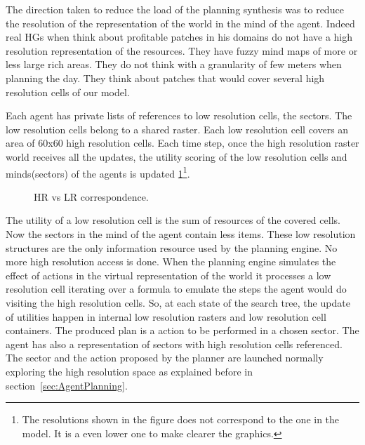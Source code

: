 \documentclass[11pt,oneside,a4paper,openright]{report}
\begin{document}
The direction taken to reduce the load of the planning synthesis was to reduce the resolution of the representation of the world in the mind of the agent. Indeed real HGs when think about profitable patches in his domains do not have a high resolution representation of the resources. They have fuzzy mind maps of more or less large rich areas. They do not think with a granularity of few meters when planning the day. They think about patches that would cover several high resolution cells of our model.

Each agent has private lists of references to low resolution cells, the sectors. The low resolution cells belong to a shared raster. Each low resolution cell covers an area of 60x60 high resolution cells. Each time step, once the high resolution raster world receives all the updates, the utility scoring of the low resolution cells and minds(sectors) of the agents is updated \ref{fig:LRMaps1}\footnote{The resolutions shown in the figure does not correspond to the one in the model. It is a even lower one to make clearer the graphics.}.

		\begin{figure}[!h]
		\centering
		\setlength\fboxsep{0pt}
		\setlength\fboxrule{0.5pt}
		\caption{HR vs LR correspondence.}
		\label{fig:LRMaps1}
		\end{figure}

The utility of a low resolution cell is the sum of resources of the covered cells. Now the sectors in the mind of the agent contain less items. These low resolution structures are the only information resource used by the planning engine. No more high resolution access is done. When the planning engine simulates the effect of actions in the virtual representation of the world it processes a low resolution cell iterating over a formula to emulate the steps the agent would do visiting the high resolution cells. So, at each state of the search tree, the update of utilities happen in internal low resolution rasters and low resolution cell containers. The produced plan is a action to be performed in a chosen sector. The agent has also a representation of sectors with high resolution cells referenced. The sector and the action proposed by the planner are launched normally exploring the high resolution space as explained before in section~\ref{sec:AgentPlanning}.
\end{document}
